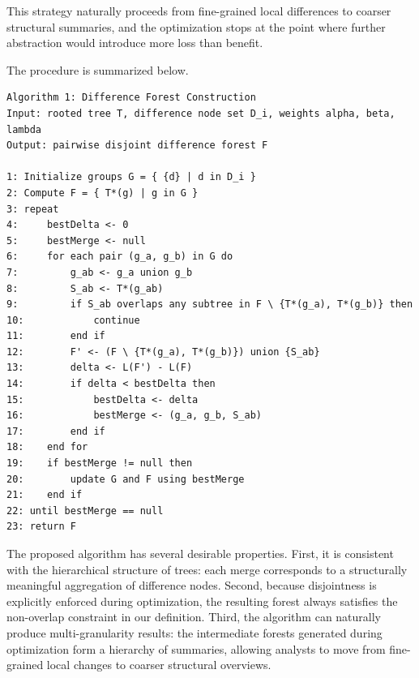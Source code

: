 This strategy naturally proceeds from fine-grained local differences to coarser structural summaries, and the optimization stops at the point where further abstraction would introduce more loss than benefit.

The procedure is summarized below.

\begin{verbatim}
Algorithm 1: Difference Forest Construction
Input: rooted tree T, difference node set D_i, weights alpha, beta, lambda
Output: pairwise disjoint difference forest F

1: Initialize groups G = { {d} | d in D_i }
2: Compute F = { T*(g) | g in G }
3: repeat
4:     bestDelta <- 0
5:     bestMerge <- null
6:     for each pair (g_a, g_b) in G do
7:         g_ab <- g_a union g_b
8:         S_ab <- T*(g_ab)
9:         if S_ab overlaps any subtree in F \ {T*(g_a), T*(g_b)} then
10:            continue
11:        end if
12:        F' <- (F \ {T*(g_a), T*(g_b)}) union {S_ab}
13:        delta <- L(F') - L(F)
14:        if delta < bestDelta then
15:            bestDelta <- delta
16:            bestMerge <- (g_a, g_b, S_ab)
17:        end if
18:    end for
19:    if bestMerge != null then
20:        update G and F using bestMerge
21:    end if
22: until bestMerge == null
23: return F
\end{verbatim}


The proposed algorithm has several desirable properties. First, it is consistent with the hierarchical structure of trees: each merge corresponds to a structurally meaningful aggregation of difference nodes. Second, because disjointness is explicitly enforced during optimization, the resulting forest always satisfies the non-overlap constraint in our definition. Third, the algorithm can naturally produce multi-granularity results: the intermediate forests generated during optimization form a hierarchy of summaries, allowing analysts to move from fine-grained local changes to coarser structural overviews.
%

